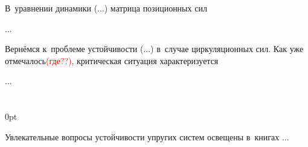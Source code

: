 \begin{otherlanguage}{russian}

В~уравнении динамики (...) матрица позиционных сил

...



\end{otherlanguage}



\begin{otherlanguage}{russian}

Вернёмся к~проблеме устойчивости (...) в~случае циркуляционных сил.
Как уже отмечалось\textcolor{red}{(где??)}, критическая ситуация характеризуется

...



\end{otherlanguage}

\section*{\small \wordforbibliography}

\begin{changemargin}{\parindent}{0pt}
\fontsize{10}{12}\selectfont

\begin{otherlanguage}{russian}

Увлекательные вопросы устойчивости упругих систем освещены в~книгах ...

\end{otherlanguage}

\end{changemargin}
